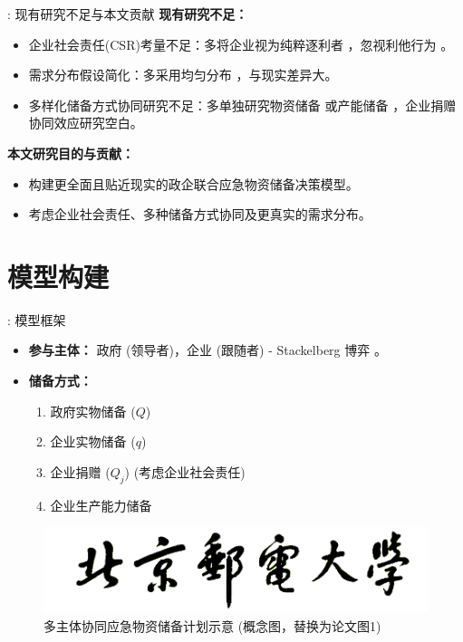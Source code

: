 \documentclass[9pt]{beamer}
\begin{document}
\begin{frame}{\insertsectionhead: 现有研究不足与本文贡献}
    \textbf{现有研究不足：}
    \begin{itemize}
        \item 企业社会责任(CSR)考量不足：多将企业视为纯粹逐利者 \cite{Li2022Stackelberg, Chen2023Contract}，忽视利他行为 \cite{zhengh2023}。
        \item 需求分布假设简化：多采用均匀分布 \cite{chai2021考虑储备周期, chen2014突发事件灾前应急物资政企联合储备模式}，与现实差异大。
        \item 多样化储备方式协同研究不足：多单独研究物资储备 \cite{Li2022Stackelberg, li2022政企联合储备, Chen2023Contract} 或产能储备 \cite{Gong2024Quantity}，企业捐赠协同效应研究空白。
    \end{itemize}
    \textbf{本文研究目的与贡献：}
    \begin{itemize}
        \item 构建更全面且贴近现实的政企联合应急物资储备决策模型。
        \item 考虑企业社会责任、多种储备方式协同及更真实的需求分布。
    \end{itemize}
\end{frame}

\section{模型构建}
\begin{frame}{\insertsectionhead: 模型框架}
    \begin{itemize}
        \item \textbf{参与主体：} 政府 (领导者)，企业 (跟随者) - Stackelberg 博弈 \cite{Li2022Stackelberg}。
        \item \textbf{储备方式：}
            \begin{enumerate}
                \item 政府实物储备 ($Q$)
                \item 企业实物储备 ($q$)
                \item 企业捐赠 ($Q_j$) (考虑企业社会责任)
                \item 企业生产能力储备
            \end{enumerate}
    \end{itemize}
    \begin{figure}
        \centering
        \includegraphics[width=0.8\linewidth]{basic_pictures/image.png}
        \caption{多主体协同应急物资储备计划示意 (概念图，替换为论文图1)}
    \end{figure}
\end{frame}
\end{document}

